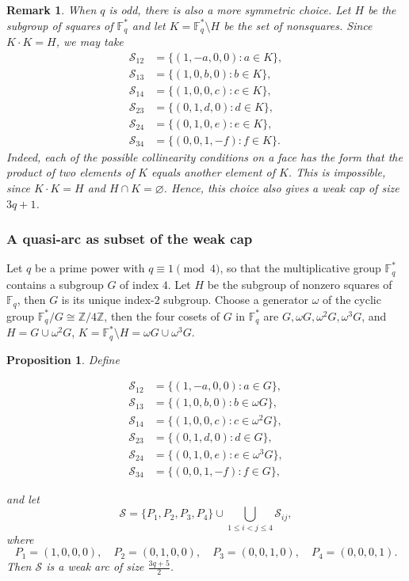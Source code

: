 \documentclass{article}
\newtheorem{proposition}{Proposition}
\newtheorem{remark}{Remark}
\newcommand{\F}{\mathbb{F}}
\begin{document}
\begin{remark}
When $q$ is odd, there is also a more symmetric choice. Let $H$ be the
subgroup of squares of $\F_q^\ast$ and let $K=\F_q^\ast\setminus H$ be
the set of nonsquares. Since $K\cdot K=H$, we may take
\begin{align*}
\mathcal S_{12}&=\{(1,-a,0,0):a\in K\},\\
\mathcal S_{13}&=\{(1,0,b,0):b\in K\},\\
\mathcal S_{14}&=\{(1,0,0,c):c\in K\},\\
\mathcal S_{23}&=\{(0,1,d,0):d\in K\},\\
\mathcal S_{24}&=\{(0,1,0,e):e\in K\},\\
\mathcal S_{34}&=\{(0,0,1,-f):f\in K\}.
\end{align*}
Indeed, each of the possible collinearity conditions on a face has the
form that the product of two elements of $K$ equals another element of
$K$. This is impossible, since $K\cdot K=H$ and $H\cap K=\varnothing$.
Hence, this choice also gives a weak cap of size $3q+1$.
\end{remark}


\subsubsection{A quasi-arc as subset of the weak cap}\label{subsection:subset}




Let $q$ be a prime power with $q\equiv 1\pmod 4$, so that the multiplicative
group $\mathbb{F}_q^*$ contains a subgroup $G$ of index $4$. Let $H$ be the subgroup of nonzero squares of $\F_q$, then  $G$ is its unique
index-$2$ subgroup. Choose a generator $\omega$ of the cyclic group
$\mathbb{F}_q^*/G\cong\mathbb{Z}/4\mathbb{Z}$, then the four cosets of $G$ in $\mathbb{F}_q^*$ are $
   G, \omega G, \omega^2G, \omega^3G$, and $H=G\cup \omega^2G$, $K=\F_q^*\setminus H =\omega G\cup \omega^3G.$

\begin{proposition}\label{prop:weakarc3D} Define

\begin{align*}
\mathcal S_{12}&=\{(1,-a,0,0):a\in G\},\\
\mathcal S_{13}&=\{(1,0,b,0):b\in \omega G\},\\
\mathcal S_{14}&=\{(1,0,0,c):c\in \omega ^2G\},\\
\mathcal S_{23}&=\{(0,1,d,0):d\in G\},\\
\mathcal S_{24}&=\{(0,1,0,e):e\in \omega^3G\},\\
\mathcal S_{34}&=\{(0,0,1,-f):f\in G\},
\end{align*}

and let
\[
\mathcal S=
\{P_1,P_2,P_3,P_4\}
\cup
\bigcup_{1\le i<j\le 4}\mathcal S_{ij},
\]
where
\[
P_1=(1,0,0,0),\quad
P_2=(0,1,0,0),\quad
P_3=(0,0,1,0),\quad
P_4=(0,0,0,1).
\]
Then  $\mathcal S$ is a weak arc of size $\frac{3q+5}{2}$.
\end{proposition}
\end{document}
